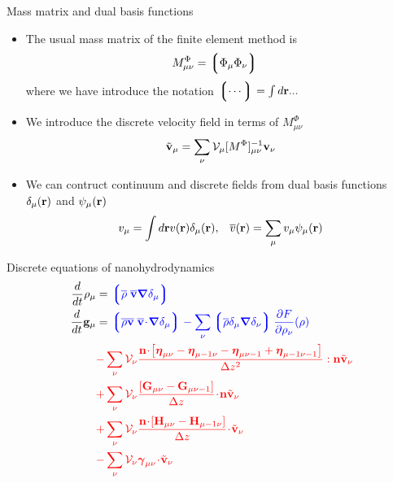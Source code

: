 \documentclass{beamer}
\newcommand{\esc}{\!\cdot\!}
\newcommand{\llg}{\left\lgroup}
\newcommand{\rlg}{\right\rgroup}
\begin{document}
\begin{frame}{Mass matrix and dual basis functions}
  \begin{itemize}
    \item The usual mass matrix of the finite element method is
      \begin{align}
      M^\Phi_{\mu\nu}&=\llg\Phi_\mu\Phi_\nu\rlg  
      \nonumber
      \end{align}
      where we have introduce the notation $\llg\cdots\rlg=\int d{\bf r}...$
    \item We introduce the discrete velocity field in terms of $M^\Phi_{\mu\nu}$
      \begin{align}
        \tilde{{\bf v}}_{\mu}=\sum_{\nu}{\cal V}_{\mu}[M^{\Phi}]^{-1}_{\mu\nu}{\bf v}_{\nu}
        \nonumber
      \end{align}
  \item We can contruct continuum and discrete fields from dual basis functions $\delta_{\mu}({\bf r})$ and $\psi_\mu({\bf r})$ 
    \begin{align}
      v_\mu=\int d{\bf r}v({\bf r})\delta_\mu({\bf r}),&&
        \overline{v}({\bf r}) =\sum_{\mu}v_\mu\psi_\mu({\bf r})
    \nonumber
    \end{align}
  \end{itemize}
\end{frame}

\begin{frame}{Discrete equations of nanohydrodynamics}
\begin{align}
  \frac{d}{dt}\rho_\mu&=  {\color{blue} \llg\overline{\rho} \; \overline{\bf v}\boldsymbol{\nabla}\delta_\mu \rlg}
\nonumber\\
\frac{d}{dt}{\bf g}_\mu&=
{\color{blue} \llg\overline{\rho} \overline{\bf v}\;\overline{\bf v}\esc\boldsymbol{\nabla}\delta_{\mu}\rlg
-\sum_\nu\llg\overline{\rho}\delta_{\mu}\boldsymbol{\nabla}\delta_{\nu}\rlg
\frac{\partial  F}{\partial \rho_{\nu}}(\rho)}
\nonumber\\
&{\color{red}-\sum_{\nu}{\cal V}_\nu \frac{{\bf n}\esc\left[\boldsymbol{\eta}_{\mu\nu}-\boldsymbol{\eta}_{\mu-1\nu}-\boldsymbol{\eta}_{\mu\nu-1}+\boldsymbol{\eta}_{\mu-1\nu-1}\right]}{\Delta z^2}:{\bf n}\tilde{\bf v}_\nu}
\nonumber\\
&{\color{red}+\sum_{\nu}{\cal V}_\nu\frac{\left[{\bf G}_{\mu\nu}-{\bf G}_{\mu\nu-1}\right]}{\Delta z}\esc{\bf n}\tilde{\bf v}_\nu}
\nonumber\\
&{\color{red}+\sum_{\nu}{\cal V}_\nu\frac{{\bf n}\esc\left[{\bf H}_{\mu\nu}-{\bf H}_{\mu-1\nu}\right]}{\Delta z}\esc\tilde{\bf v}_\nu}
\nonumber\\
&{\color{red}-\sum_{\nu}{\cal V}_\nu\boldsymbol{\gamma}_{\mu\nu}\esc\tilde{\bf v}_\nu}
\nonumber
\end{align}
\end{frame}
\end{document}
